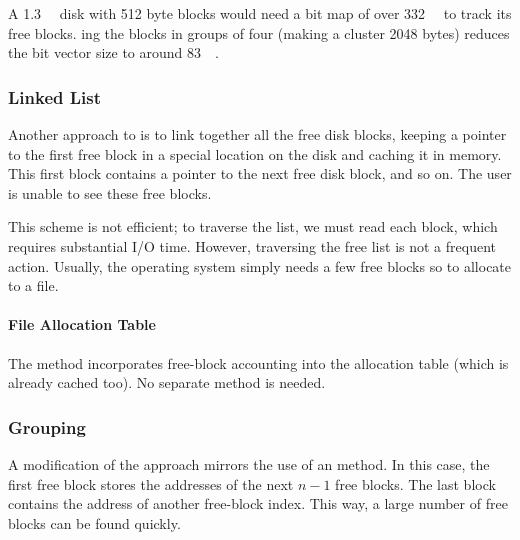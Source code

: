 A \SI{1.3}{\gibi{} \byte{}} disk with 512 byte blocks would need a bit map of over \SI{332}{\kibi{} \byte{}} to track its free blocks.
ing the blocks in groups of four (making a cluster 2048 bytes) reduces the bit vector size to around \SI{83}{\kibi{} \byte{}}.

\subsubsection{Linked List}\label{subsubsec:Free_Space_Linked_List}
Another approach to  is to link together all the free disk blocks, keeping a pointer to the first free block in a special location on the disk and caching it in memory.
This first block contains a pointer to the next free disk block, and so on.
The user is unable to see these free blocks.

This scheme is not efficient; to traverse the list, we must read each block, which requires substantial I/O time.
However, traversing the free list is not a frequent action.
Usually, the operating system simply needs a few free blocks so to allocate to a file.

\paragraph{File Allocation Table}\label{par:FAT_Free_Space}
The  method incorporates free-block accounting into the allocation table (which is already cached too).
No separate method is needed.

\subsubsection{Grouping}\label{subsubsec:Free_Space_Grouping}
A modification of the  approach mirrors the use of an  method.
In this case, the first free block stores the addresses of the next $n-1$ free blocks.
The last block contains the address of another free-block index.
This way, a large number of free blocks can be found quickly.


